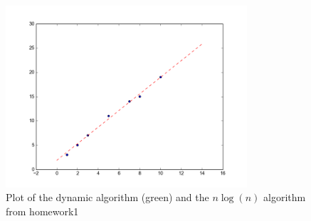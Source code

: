 \documentclass[11pt,letterpaper]{article}
\begin{document}
\begin{figure}[h!]
\centering
\includegraphics[width=0.8\textwidth]{figure_1}
\caption{Plot of the dynamic algorithm (green) and the $n\log(n)$ algorithm from homework1}
\end{figure} 
\end{document}
